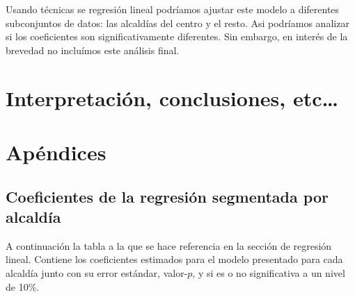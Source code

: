 \documentclass[
  spanish,
]{article}
\begin{document}
Usando técnicas se regresión lineal podríamos ajustar este modelo a
diferentes subconjuntos de datos: las alcaldías del centro y el resto.
Asi podríamos analizar si los coeficientes son significativamente
diferentes. Sin embargo, en interés de la brevedad no incluímos este
análisis final.

\hypertarget{interpretaciuxf3n-conclusiones-etc}{%
\section{Interpretación, conclusiones,
etc\ldots{}}\label{interpretaciuxf3n-conclusiones-etc}}

\hypertarget{apuxe9ndices}{%
\section{Apéndices}\label{apuxe9ndices}}

\hypertarget{coeficientes-de-la-regresiuxf3n-segmentada-por-alcalduxeda}{%
\subsection{Coeficientes de la regresión segmentada por
alcaldía}\label{coeficientes-de-la-regresiuxf3n-segmentada-por-alcalduxeda}}

A continuación la tabla a la que se hace referencia en la sección de
regresión lineal. Contiene los coeficientes estimados para el modelo
presentado para cada alcaldía junto con su error estándar, valor-\(p\),
y si es o no significativa a un nivel de 10\%.
\end{document}
